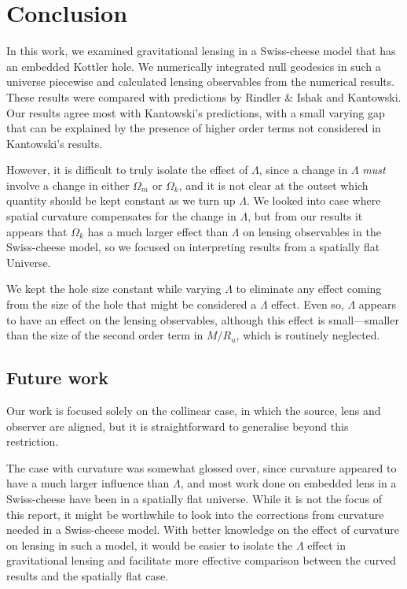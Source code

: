\chapter{Conclusion}
\label{chapter:conclusion}

In this work, we examined gravitational lensing in a Swiss-cheese model that has an embedded Kottler hole. We numerically integrated null geodesics in such a universe piecewise and calculated lensing observables from the numerical results. These results were compared with predictions by Rindler \& Ishak and Kantowski. Our results agree most with Kantowski's predictions, with a small varying gap that can be explained by the presence of higher order terms not considered in Kantowski's results. 

However, it is difficult to truly isolate the effect of $\Lambda$, since a change in $\Lambda$ \emph{must} involve a change in either $\Omega_m$ or $\Omega_k$, and it is not clear at the outset which quantity should be kept constant as we turn up $\Lambda$. We looked into case where spatial curvature compensates for the change in $\Lambda$, but from our results it appears that $\Omega_k$ has a much larger effect than $\Lambda$ on lensing observables in the Swiss-cheese model, so we focused on interpreting results from a spatially flat Universe. 

We kept the hole size constant while varying $\Lambda$ to eliminate any effect coming from the size of the hole that might be considered a $\Lambda$ effect. Even so, $\Lambda$ appears to have an effect on the lensing observables, although this effect is small---smaller than the size of the second order term in $M/R_u$, which is routinely neglected. 

\section{Future work}

Our work is focused solely on the collinear case, in which the source, lens and observer are aligned, but it is straightforward to generalise beyond this restriction. 

The case with curvature was somewhat glossed over, since curvature appeared to have a much larger influence than $\Lambda$, and most work done on embedded lens in a Swiss-cheese have been in a spatially flat universe. While it is not the focus of this report, it might be worthwhile to look into the corrections from curvature needed in a Swiss-cheese model.  With better knowledge on the effect of curvature on lensing in such a model, it would be easier to isolate the $\Lambda$ effect in gravitational lensing and facilitate more effective comparison between the curved results and the spatially flat case. 

